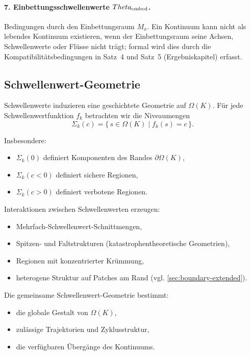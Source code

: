 \paragraph{7. Einbettungsschwellenwerte \(\Theta_{\rm embed}\).}
Bedingungen durch den Einbettungsraum \(M_x\).
Ein Kontinuum kann nicht als lebendes Kontinuum existieren, wenn der Einbettungsraum
seine Achsen, Schwellenwerte oder Flüsse nicht trägt; formal wird dies durch die
Kompatibilitätsbedingungen in Satz~4 und Satz~5 (Ergebniskapitel) erfasst.

\subsection{Schwellenwert-Geometrie}

Schwellenwerte induzieren eine geschichtete Geometrie auf \(\Omega(K)\).
Für jede Schwellenwertfunktion \(f_k\) betrachten wir die Niveaumengen
\[
  \Sigma_k(c) = \{\, s \in \Omega(K) \mid f_k(s) = c \,\}.
\]

Insbesondere:
\begin{itemize}
    \item \(\Sigma_k(0)\) definiert Komponenten des Randes \(\partial\Omega(K)\),
    \item \(\Sigma_k(c<0)\) definiert sichere Regionen,
    \item \(\Sigma_k(c>0)\) definiert verbotene Regionen.
\end{itemize}

Interaktionen zwischen Schwellenwerten erzeugen:
\begin{itemize}
    \item Mehrfach-Schwellenwert-Schnittmengen,
    \item Spitzen- und Faltstrukturen (katastrophentheoretische Geometrien),
    \item Regionen mit konzentrierter Krümmung,
    \item heterogene Struktur auf Patches am Rand
          (vgl. \ref{sec:boundary-extended}).
\end{itemize}

Die gemeinsame Schwellenwert-Geometrie bestimmt:
\begin{itemize}
    \item die globale Gestalt von \(\Omega(K)\),
    \item zulässige Trajektorien und Zyklusstruktur,
    \item die verfügbaren Übergänge des Kontinuums.
\end{itemize}

